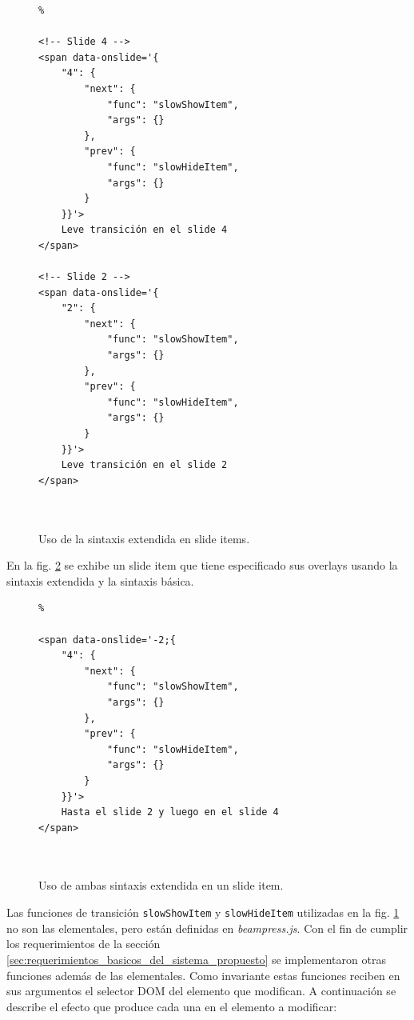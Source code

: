 			\begin{figure}[htb]%
				\begin{lstlisting}%

<!-- Slide 4 -->
<span data-onslide='{
    "4": {
        "next": {
            "func": "slowShowItem",
            "args": {}
        },
        "prev": {
            "func": "slowHideItem",
            "args": {}
        }
    }}'>
	Leve transición en el slide 4
</span>

<!-- Slide 2 -->
<span data-onslide='{
    "2": {
        "next": {
            "func": "slowShowItem",
            "args": {}
        },
        "prev": {
            "func": "slowHideItem",
            "args": {}
        }
    }}'>
	Leve transición en el slide 2
</span>

			
				\end{lstlisting}
				\caption{Uso de la sintaxis extendida en slide items.} 
				\label{fig:extended_syntax_html}
			\end{figure}

			En la fig. \ref{fig:basic_and_extended_syntax_html} se exhibe un slide item que tiene especificado sus overlays usando la sintaxis extendida y la sintaxis básica.


			\begin{figure}[htb]%
				\begin{lstlisting}%

<span data-onslide='-2;{
    "4": {
        "next": {
            "func": "slowShowItem",
            "args": {}
        },
        "prev": {
            "func": "slowHideItem",
            "args": {}
        }
    }}'>
	Hasta el slide 2 y luego en el slide 4
</span>

			
				\end{lstlisting}
				\caption{Uso de ambas sintaxis extendida en un slide item.} 
				\label{fig:basic_and_extended_syntax_html}
			\end{figure}			


			Las funciones de transición \texttt{slowShowItem} y \texttt{slowHideItem} utilizadas en la fig. \ref{fig:extended_syntax_html} no son las elementales, pero están definidas en \textit{beampress.js}. Con el fin de cumplir los requerimientos de la sección \ref{sec:requerimientos_basicos_del_sistema_propuesto} se implementaron otras funciones además de las elementales. Como invariante estas funciones reciben en sus argumentos el selector DOM del elemento que modifican. A continuación se describe el efecto que produce cada una en el elemento a modificar:


